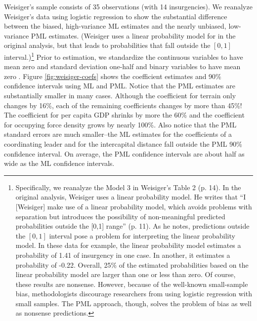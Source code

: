 \documentclass[12pt]{article}
\begin{document}
Weisiger's sample consists of 35 observations (with 14 insurgencies). 
We reanalyze Weisiger's data using logistic regression to show the substantial difference between the biased, high-variance ML estimates and the nearly unbiased, low-variance PML estimates. 
(Weisiger uses a linear probability model for in the original analysis, but that leads to probabilities that fall outside the $[0, 1]$ interval.)\footnote{Specifically, we reanalyze the Model 3 in Weisiger's Table 2 (p. 14). 
In the original analysis, Weisiger uses a linear probability model. 
He writes that ``I [Weisiger] make use of a linear probability model, which avoids problems with separation but introduces the possibility of non-meaningful predicted probabilities outside the [0,1] range'' (p. 11).
As he notes, predictions outside the $[0, 1]$ interval pose a problem for interpreting the linear probability model. 
In these data for example, the linear probability model estimates a probability of 1.41 of insurgency in one case. 
In another, it estimates a probability of -0.22. 
Overall, 25\% of the estimated probabilities based on the linear probability model are larger than one or less than zero.
Of course, these results are nonsense. 
However, because of the well-known small-sample bias, methodologists discourage researchers from using logistic regression with small samples.
The PML approach, though, solves the problem of bias as well as nonsense predictions.} Prior to estimation, we standardize the continuous variables to have mean zero and standard deviation one-half and binary variables to have mean zero \citep{Gelman2008}.
Figure \ref{fig:weisiger-coefs} shows the coefficient estimates and 90\% confidence intervals using ML and PML. 
Notice that the PML estimates are substantially smaller in many cases.
Although the coefficient for terrain only changes by 16\%, each of the remaining coefficients changes by more than 45\%! 
The coefficient for per capita GDP shrinks by more the 60\% and the coefficient for occupying force density grows by nearly 100\%.
Also notice that the PML standard errors are much smaller--the ML estimates for the coefficients of a coordinating leader and for the intercapital distance fall outside the PML 90\% confidence interval.
On average, the PML confidence intervals are about half as wide as the ML confidence intervals.
\end{document}
